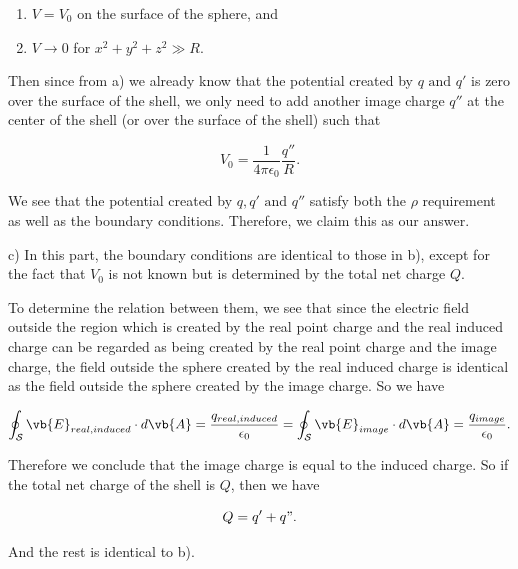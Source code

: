 \documentclass[a4paper,12pt]{report}
\begin{document}
\begin{example_template}
		\begin{enumerate}
			\item \(V = V_0\) on the surface of the sphere, and
			\item \(V \rightarrow 0\) for \(x^2 + y^2 + z^2 \gg R\).	 
		\end{enumerate}
		
		Then since from a) we already know that the potential created by \(q \text{ and } q'\) is zero over the surface of the shell, we only need to add another image charge \(q''\) at the center of the shell (or over the surface of the shell) such that 
		
		\begin{equation}
			V_0 = \frac{1}{4\pi\epsilon_0} \frac{q''}{R}.
		\end{equation}
		
		We see that the potential created by \(q, q' \text{ and } q''\) satisfy both the \(\rho \) requirement as well as the boundary conditions. Therefore, we claim this as our answer. \newline
		
		c) In this part, the boundary conditions are identical to those in b), except for the fact that \(V_0\) is not known but is determined by the total net charge \(Q\). 
		
		To determine the relation between them, we see that since the electric field outside the region which is created by the real point charge and the real induced charge can be regarded as being created by the real point charge and the image charge, the field outside the sphere created by the real induced charge is identical as the field outside the sphere created by the image charge. So we have
		
		\begin{equation}
			\oint _{\mathcal{S} } \vb{E}_{real, induced}  \cdot d\vb{A} = \frac{q_{real, induced}}{\epsilon_0} = \oint _{\mathcal{S} } \vb{E} _{image} \cdot d\vb{A} = \frac{q_{image}}{\epsilon_0} .
		\end{equation}
		
		Therefore we conclude that the image charge is equal to the induced charge. So if the total net charge of the shell is \(Q\), then  we have
		
		\begin{equation}
			Q = q' + q".
		\end{equation}
		
		And the rest is identical to b).
		
	\end{example_template}
	
\end{document}
